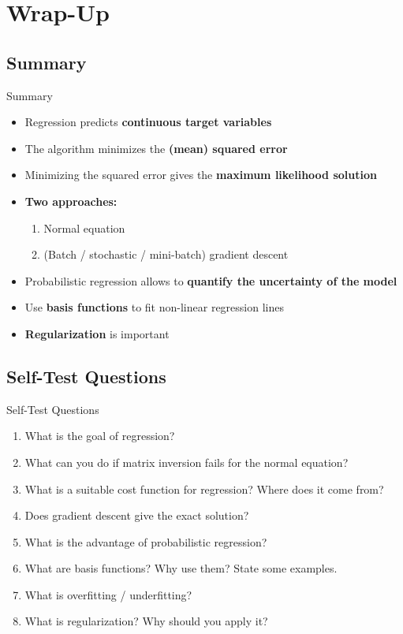\section{Wrap-Up}

\subsection{Summary}

\begin{frame}{Summary}{}
	\begin{itemize}
		\item Regression predicts \textbf{continuous target variables}
		\item The algorithm minimizes the \textbf{(mean) squared error}
		\item Minimizing the squared error gives the \textbf{maximum likelihood solution}
		\item \textbf{Two approaches:}
		\begin{enumerate}
			\item Normal equation
			\item (Batch / stochastic / mini-batch) gradient descent
		\end{enumerate}
		\item Probabilistic regression allows to \textbf{quantify the uncertainty of the model}
		\item Use \textbf{basis functions} to fit non-linear regression lines
		\item \textbf{Regularization} is important
	\end{itemize}
\end{frame}


\subsection{Self-Test Questions}

\begin{frame}{Self-Test Questions}{}\important
	\begin{enumerate}
		\item What is the goal of regression?
		\item What can you do if matrix inversion fails for the normal equation?
		\item What is a suitable cost function for regression? Where does it come from?
		\item Does gradient descent give the exact solution?
		\item What is the advantage of probabilistic regression?
		\item What are basis functions? Why use them? State some examples.
		\item What is overfitting / underfitting?
		\item What is regularization? Why should you apply it?
	\end{enumerate}
\end{frame}


